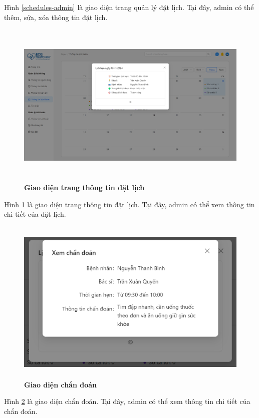 Hình \ref{schedules-admin} là giao diện trang quản lý đặt lịch. Tại đây, admin có thể thêm, sửa, xóa thông tin đặt lịch.
\begin{figure}[H]
	\centering
	\includegraphics[width=15cm,height=8cm]{Images/admin_ui/schedule-info.png}
	\caption[Giao diện trang thông tin đặt lịch]{\bfseries \fontsize{12pt}{0pt}\selectfont Giao diện trang thông tin đặt lịch}
	\label{schedule-info-admin}
\end{figure}

Hình \ref{schedule-info-admin} là giao diện trang thông tin đặt lịch. Tại đây, admin có thể xem thông tin chi tiết của đặt lịch.

\begin{figure}[H]
	\centering
	\includegraphics[width=15cm,height=8cm]{Images/admin_ui/diagnosis.png}
	\caption[Giao diện chẩn đoán]{\bfseries \fontsize{12pt}{0pt}\selectfont Giao diện chẩn đoán}
	\label{diag-admin}
\end{figure}

Hình \ref{diag-admin} là giao diện chẩn đoán. Tại đây, admin có thể xem thông tin chi tiết của chẩn đoán.

